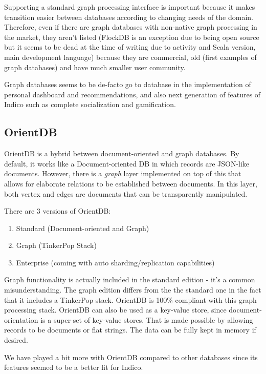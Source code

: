 Supporting a standard graph processing interface is important because it makes transition easier between databases according to changing needs of the domain. Therefore, even if there are graph databases with non-native graph processing in the market, they aren't listed (FlockDB is an exception due to being open source but it seems to be dead at the time of writing due to activity and Scala version, main development language) because they are commercial, old (first examples of graph databases) and have much smaller user community.

Graph databases seems to be de-facto go to database in the implementation of personal dashboard and recommendations, and also next generation of features of Indico such as complete socialization and gamification.

\subsection{OrientDB}

OrientDB is a hybrid between document-oriented and graph databases. By default, it works like a Document-oriented DB in which records are JSON-like documents. However, there is a \textit{graph} layer implemented on top of this that allows for elaborate relations to be established between documents. In this layer, both vertex and edges are documents that can be transparently manipulated.

There are 3 versions of OrientDB: 
\begin{enumerate}
  \item Standard (Document-oriented and Graph)
  \item Graph (TinkerPop Stack)
  \item Enterprise (coming with auto sharding/replication capabilities)
\end{enumerate}

Graph functionality is actually included in the standard edition - it's a common misunderstanding. The graph edition differs from the the standard one in the fact that it includes a TinkerPop stack. OrientDB is 100\% compliant with this graph processing stack. OrientDB can also be used as a key-value store, since document-orientation is a super-set of key-value stores. That is made possible by allowing records to be documents or flat strings. The data can be fully kept in memory if desired.

We have played a bit more with OrientDB compared to other databases since its features seemed to be a better fit for Indico.

